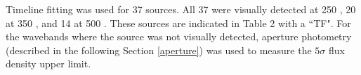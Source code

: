 Timeline fitting was used for 37 sources. All 37 were visually detected at 250 \um{}, 20 at 350 \um{}, and 14 at 500 \um. These sources are indicated in Table 2 with a ``TF". For the wavebands where the source was not visually detected, aperture photometry (described in the following Section \ref{aperture}) was used to measure the $5\sigma$ flux density upper limit.